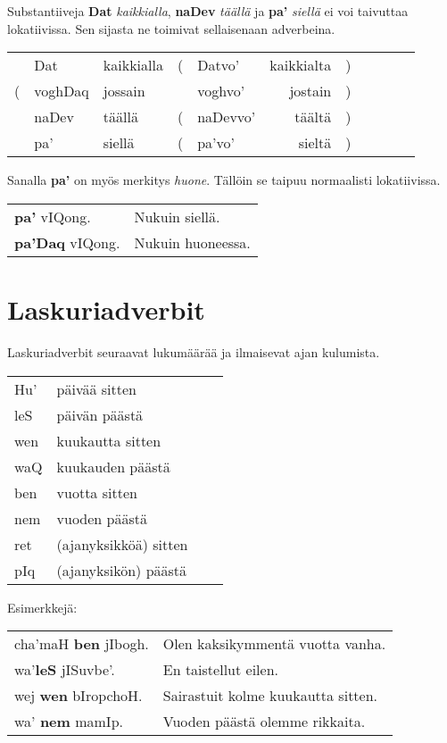 \documentclass{book}
\begin{document}
Substantiiveja \textbf{Dat} \textit{kaikkialla}, \textbf{naDev} \textit{täällä} ja \textbf{pa'} \textit{siellä} ei voi taivuttaa lokatiivissa.
Sen sijasta ne toimivat sellaisenaan adverbeina.

\begin{tabular}{r Bl Il | r Bl Il l}
    & Dat & kaikkialla & ( & Datvo' & kaikkialta & ) \\
    ( & voghDaq & jossain & & voghvo' & jostain & ) \\
    & naDev & täällä & ( & naDevvo' & täältä & ) \\
    & pa' & siellä & ( & pa'vo' & sieltä & ) \\
\end{tabular}

Sanalla \textbf{pa'} on myös merkitys \textit{huone}.
Tällöin se taipuu normaalisti lokatiivissa.

\begin{tabular}{l l}
    \textbf{pa'} vIQong. & Nukuin siellä. \\
    \textbf{pa'Daq} vIQong. & Nukuin huoneessa. \\
\end{tabular}

\section{Laskuriadverbit}

Laskuriadverbit seuraavat lukumäärää ja ilmaisevat ajan kulumista.

\begin{tabular}{Bl Il}
    Hu' & päivää sitten \\
    leS & päivän päästä \\
    wen & kuukautta sitten \\
    waQ & kuukauden päästä \\
    ben & vuotta sitten \\
    nem & vuoden päästä \\
    ret & (ajanyksikköä) sitten \\
    pIq & (ajanyksikön) päästä \\
\end{tabular}

Esimerkkejä:

\begin{tabular}{l l}
    cha'maH \textbf{ben} jIbogh. & Olen kaksikymmentä vuotta vanha. \\
    wa'\textbf{leS} jISuvbe'. & En taistellut eilen. \\
    wej \textbf{wen} bIropchoH. & Sairastuit kolme kuukautta sitten. \\
    wa' \textbf{nem} mamIp. & Vuoden päästä olemme rikkaita. \\
\end{tabular}
\end{document}
